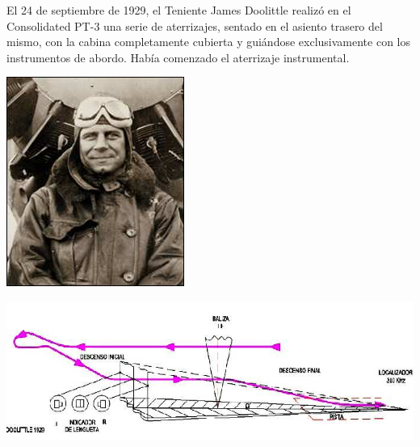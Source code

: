 \begin{tcolorbox}
El 24 de septiembre de 1929, el Teniente James Doolittle realizó en el Consolidated PT-3 una serie de aterrizajes, sentado en el asiento trasero del mismo, con la cabina completamente cubierta y guiándose exclusivamente
con los instrumentos de abordo. Había comenzado el aterrizaje instrumental. \vspace{3mm}

\begin{minipage}[c]{0.3\linewidth}
    \includegraphics[width = 0.9\linewidth]{06.radionavegacion/Imagenes/06.Sistemas.Aproximacion/06_Doolittle.png}
\end{minipage}
\begin{minipage}[c]{0.7\linewidth}
  \includegraphics[width = \linewidth]{06.radionavegacion/Imagenes/06.Sistemas.Aproximacion/06_Doolittle_vuelo_1929.png}
\end{minipage}

\end{tcolorbox}

